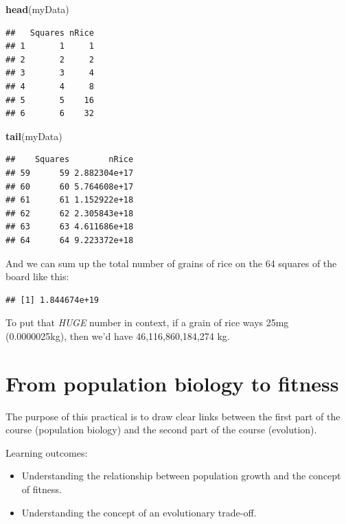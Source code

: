 \documentclass[
  a4paper]{book}
\newenvironment{Shaded}{\begin{snugshade}}{\end{snugshade}}
\newcommand{\FunctionTok}[1]{\textcolor[rgb]{0.13,0.29,0.53}{\textbf{#1}}}
\newcommand{\NormalTok}[1]{#1}
\newcommand{\SpecialCharTok}[1]{\textcolor[rgb]{0.81,0.36,0.00}{\textbf{#1}}}
\providecommand{\tightlist}{%
  \setlength{\itemsep}{0pt}\setlength{\parskip}{0pt}}
\begin{document}
\begin{Shaded}
\begin{Highlighting}[]
\FunctionTok{head}\NormalTok{(myData)}
\end{Highlighting}
\end{Shaded}

\begin{verbatim}
##   Squares nRice
## 1       1     1
## 2       2     2
## 3       3     4
## 4       4     8
## 5       5    16
## 6       6    32
\end{verbatim}

\begin{Shaded}
\begin{Highlighting}[]
\FunctionTok{tail}\NormalTok{(myData)}
\end{Highlighting}
\end{Shaded}

\begin{verbatim}
##    Squares        nRice
## 59      59 2.882304e+17
## 60      60 5.764608e+17
## 61      61 1.152922e+18
## 62      62 2.305843e+18
## 63      63 4.611686e+18
## 64      64 9.223372e+18
\end{verbatim}

And we can sum up the total number of grains of rice on the 64 squares of the board like this:

\begin{Shaded}
\end{Shaded}

\begin{verbatim}
## [1] 1.844674e+19
\end{verbatim}

To put that \emph{HUGE} number in context, if a grain of rice ways 25mg (0.0000025kg), then we'd have 46,116,860,184,274 kg.

\chapter{From population biology to fitness}\label{from-population-biology-to-fitness}

The purpose of this practical is to draw clear links between the first part of the course (population biology) and the second part of the course (evolution).

\begin{do-something}
Learning outcomes:

\begin{itemize}
\tightlist
\item
  Understanding the relationship between population growth and the
  concept of fitness.
\item
  Understanding the concept of an evolutionary trade-off.
\end{itemize}
\end{do-something}
\end{document}
